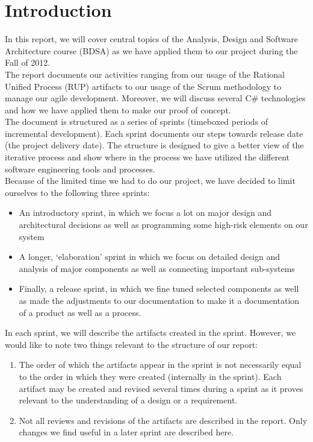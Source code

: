 \section{Introduction}
In this report, we will cover central topics of the Analysis, Design and Software Architecture course (BDSA) as we have applied them to our project during the Fall of 2012.\\
\newline
The report documents our activities ranging from our usage of the Rational Unified Process (RUP) artifacts \cite[p.~31]{OOAD} to our usage of the Scrum methodology to manage our agile development. Moreover, we will discuss several C\# technologies and how we have applied them to make our proof of concept.\\
\newline
The document is structured as a series of sprints (timeboxed periods of incremental development). Each sprint documents our steps towards release date (the project delivery date). The structure is designed to give a better view of the iterative process and show where in the process we have utilized the different software engineering tools and processes.\\
\newline
Because of the limited time we had to do our project, we have decided to limit ourselves to the following three sprints:\\
\begin{itemize}
\item An introductory sprint, in which we focus a lot on major design and architectural decisions as well as programming some high-risk elements on our system
\item A longer, ‘elaboration’ sprint in which we focus on detailed design and analysis of major components as well as connecting important sub-systems 
\item Finally, a release sprint, in which we fine tuned selected components as well as made the adjustments to our documentation to make it a documentation of a product as well as a process.
\end{itemize}
\newline
In each sprint, we will describe the artifacts created in the sprint. However,
we would like to note two things relevant to the structure of our report:\\
\begin{enumerate}
\item The order of which the artifacts appear in the sprint is not necessarily equal to the
  order in which they were created (internally in the sprint). Each artifact
  may be created and revised several times during a sprint as it proves relevant
  to the understanding of a design or a requirement. 
\item Not all reviews and revisions of the artifacts are described in the
  report. Only changes we find useful in a later sprint are described here.
\end{enumerate}
